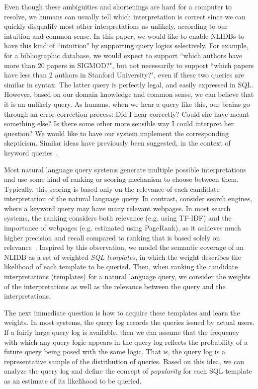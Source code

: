 \documentclass{vldb}
\begin{document}
Even though these ambiguities and shortenings are hard for a computer to resolve, we humans can usually tell which interpretation is correct since we can quickly disqualify most other interpretations as unlikely, according to our intuition and common sense.  In this paper, we would like to enable NLIDBs to have this kind of ``intuition" by supporting query logics selectively.  For example, for a bibliographic database, we would expect to support ``which authors have more than 20 papers in SIGMOD?", but not necessarily to support ``which papers have less than 2 authors in Stanford University?", even if these two queries are similar in syntax.  The latter query is perfectly legal, and easily expressed in SQL.  However, based on our domain knowledge and common sense, we can believe that it is an unlikely query.  As humans, when we hear a query like this, our brains go through an error correction process: Did I hear correctly? Could she have meant something else? Is there some other more sensible way I could interpret her question?  We would like to have our system implement the corresponding skepticism.  Similar ideas have previously been suggested, in the context of keyword queries~\cite{DBLP:conf/cidr/NandiJ09}. 

Most natural language query systems generate multiple possible interpretations and use some kind of ranking or scoring mechanism to choose between them.  Typically, this scoring is based only on the relevance of each candidate interpretation of the natural language query.  In contrast, consider search engines, where a keyword query may have many relevant webpages.  In most search systems, the ranking considers both relevance (e.g. using TF-IDF) and the importance of webpages (e.g. estimated using PageRank), as it achieves much higher precision and recall compared to ranking that is based solely on relevance~\cite{DBLP:journals/cn/BrinP98}.  Inspired by this observation, we model the semantic coverage of an NLIDB as a set of weighted {\em SQL templates}, in which the weight describes the likelihood of each template to be queried.  Then, when ranking the candidate interpretations (templates) for a natural language query, we consider the weights of the interpretations as well as the relevance between the query and the interpretations.  

The next immediate question is how to acquire these templates and learn the weights.  In most systems, the query log records the queries issued by actual users.   If a fairly large query log is available, then we can assume that the frequency with which any query logic appears in the query log reflects the probability of a future query being posed with the same logic.   That is, the query log is a representative sample of the distribution of queries.  Based on this idea, we can analyze the query log and define the concept of \emph{popularity} for each SQL template as an estimate of its likelihood to be queried.
\end{document}
